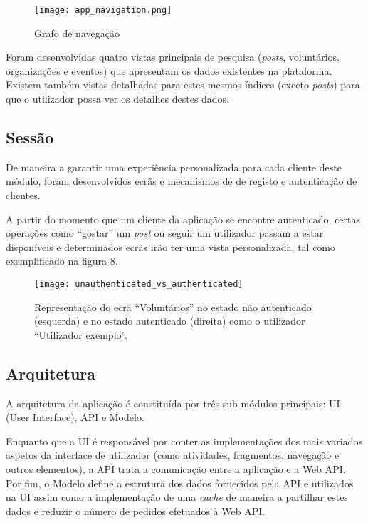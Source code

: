 \newpage

\begin{figure}[h]
	\centering
	\texttt{[image: app\_navigation.png]}
	\caption{Grafo de navegação}
\end{figure}

Foram desenvolvidas quatro vistas principais de pesquisa (\textit{posts}, voluntários, organizações e eventos) que apresentam os dados existentes na plataforma. Existem também vistas detalhadas para estes mesmos índices (exceto \textit{posts}) para que o utilizador possa ver os detalhes destes dados.

\bigskip

\subsection{Sessão}

De maneira a garantir uma experiência personalizada para cada cliente deste módulo, foram desenvolvidos ecrãs e mecanismos de de registo e autenticação de clientes.

\bigskip

A partir do momento que um cliente da aplicação se encontre autenticado, certas operações como ``gostar'' um \textit{post} ou seguir um utilizador passam a estar disponíveis e determinados ecrãs irão ter uma vista personalizada, tal como exemplificado na figura 8.

\newpage

\begin{figure}[h]
	\centering
	\texttt{[image: unauthenticated\_vs\_authenticated]}
	\caption{Representação do ecrã ``Voluntários'' no estado não autenticado (esquerda) e no estado autenticado (direita) como o utilizador ``Utilizador exemplo''.}
\end{figure}

\subsection{Arquitetura}

A arquitetura da aplicação é constituída por três sub-módulos principais: UI (User Interface), API e Modelo.

\medskip

Enquanto que a UI é responsável por conter as implementações dos mais variados aspetos da interface de utilizador (como atividades, fragmentos, navegação e outros elementos), a API trata a comunicação entre a aplicação e a Web API. Por fim, o Modelo define a estrutura dos dados fornecidos pela API e utilizados na UI assim como a implementação de uma \textit{cache} de maneira a partilhar estes dados e reduzir o número de pedidos efetuados à Web API.

